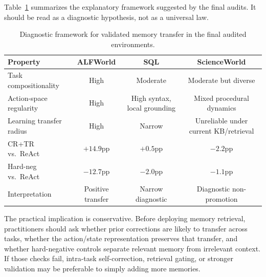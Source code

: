 Table~\ref{tab:framework} summarizes the explanatory framework suggested by the final audits.
It should be read as a diagnostic hypothesis, not as a universal law.

\begin{table}[t]
\centering
\small
\caption{Diagnostic framework for validated memory transfer in the final audited environments.}
\label{tab:framework}
\begin{tabular}{lccc}
\toprule
\textbf{Property} & \textbf{ALFWorld} & \textbf{SQL} & \textbf{ScienceWorld} \\
\midrule
Task compositionality & High & Moderate & Moderate but diverse \\
Action-space regularity & High & High syntax, local grounding & Mixed procedural dynamics \\
Learning transfer radius & High & Narrow & Unreliable under current KB/retrieval \\
\midrule
CR+TR vs.\ ReAct & $+14.9$pp & $+0.5$pp & $-2.2$pp \\
Hard-neg vs.\ ReAct & $-12.7$pp & $-2.0$pp & $-1.1$pp \\
Interpretation & Positive transfer & Narrow diagnostic & Diagnostic non-promotion \\
\bottomrule
\end{tabular}
\end{table}

The practical implication is conservative.
Before deploying memory retrieval, practitioners should ask whether prior corrections are likely to transfer across tasks, whether the action/state representation preserves that transfer, and whether hard-negative controls separate relevant memory from irrelevant context.
If those checks fail, intra-task self-correction, retrieval gating, or stronger validation may be preferable to simply adding more memories.
